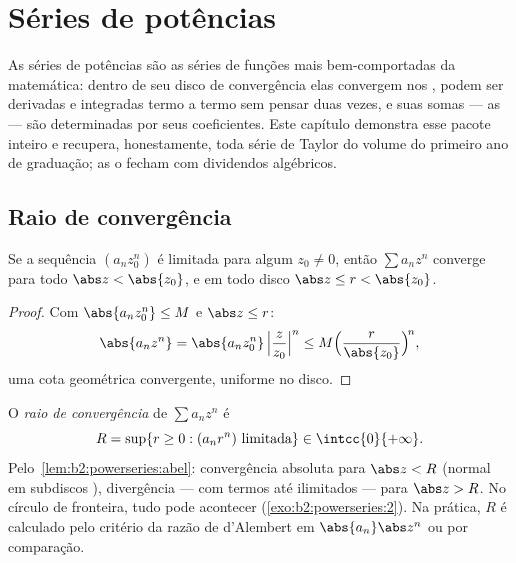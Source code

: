\chapter{Séries de potências}\label{ch:b2:powerseries}

As séries de potências são as séries de funções mais bem-comportadas da
matemática: dentro de seu disco de convergência elas convergem
 nos , podem ser derivadas e integradas termo a
termo sem pensar duas vezes, e suas somas --- as \emph{} --- são determinadas por seus coeficientes. Este capítulo
demonstra esse pacote inteiro e recupera, honestamente, toda série de
Taylor do volume do primeiro ano de graduação; as  o fecham com
dividendos algébricos.

\section{Raio de convergência}

\begin{lemma}[Abel]\label{lem:b2:powerseries:abel}
Se a sequência $(a_n z_0^n)$ é limitada para algum $z_0 \neq 0$,
então $\sum a_n z^n$ converge  para todo $\abs z < \abs
{z_0}$, e  em todo disco $\abs z \leq r < \abs{z_0}$.
\end{lemma}

\begin{proof}
Com $\abs{a_n z_0^n} \leq M$ e $\abs z \leq r$:
\[
\abs{a_n z^n} = \abs{a_n z_0^n}\,\Bigl|\frac{z}{z_0}\Bigr|^n
\leq M\Bigl(\frac{r}{\abs{z_0}}\Bigr)^{\!n},
\]
uma cota geométrica convergente, uniforme no disco.
\end{proof}

\begin{definition}\label{def:b2:powerseries:radius}
O \emph{raio de convergência} de
$\sum a_n z^n$ é
\[
R = \sup\{r \geq 0 : (a_n r^n) \text{ limitada}\} \in
\intcc{0}{+\infty} .
\]
Pelo~\cref{lem:b2:powerseries:abel}: convergência absoluta para $\abs
z < R$ (normal em subdiscos ), divergência --- com termos até
ilimitados --- para $\abs z > R$. No círculo de fronteira, tudo pode
acontecer (\cref{exo:b2:powerseries:2}). Na prática, $R$ é calculado
pelo critério da razão de d'Alembert em $\abs{a_n}\abs z^n$ ou por comparação.
\end{definition}


